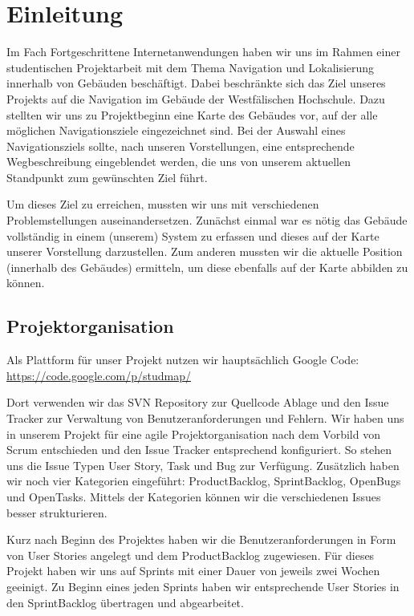 \chapter{Einleitung}
Im Fach Fortgeschrittene Internetanwendungen haben wir uns im Rahmen einer studentischen Projektarbeit mit dem Thema Navigation und Lokalisierung innerhalb von Gebäuden beschäftigt. Dabei beschränkte sich das Ziel unseres Projekts auf die Navigation im Gebäude der Westfälischen Hochschule. Dazu stellten wir uns zu Projektbeginn eine Karte des Gebäudes vor, auf der alle möglichen Navigationsziele eingezeichnet sind. Bei der Auswahl eines Navigationsziels sollte, nach unseren Vorstellungen, eine entsprechende Wegbeschreibung eingeblendet werden, die uns von unserem aktuellen Standpunkt zum gewünschten Ziel führt.

Um dieses Ziel zu erreichen, mussten wir uns mit verschiedenen Problemstellungen auseinandersetzen. Zunächst einmal war es nötig das Gebäude vollständig in einem (unserem) System zu erfassen und dieses auf der Karte unserer Vorstellung darzustellen. Zum anderen mussten wir die aktuelle Position (innerhalb des Gebäudes) ermitteln, um diese ebenfalls auf der Karte abbilden zu können.

\section{Projektorganisation}
Als Plattform für unser Projekt nutzen wir hauptsächlich Google Code:\\
\href{https://code.google.com/p/studmap/}{https://code.google.com/p/studmap/}

Dort verwenden wir das SVN Repository zur Quellcode Ablage und den Issue Tracker zur Verwaltung von Benutzeranforderungen und Fehlern. Wir haben uns in unserem Projekt für eine agile Projektorganisation nach dem Vorbild von Scrum entschieden und den Issue Tracker entsprechend konfiguriert. So stehen uns die Issue Typen User Story, Task und Bug zur Verfügung. Zusätzlich haben wir noch vier Kategorien eingeführt: ProductBacklog, SprintBacklog, OpenBugs und OpenTasks. Mittels der Kategorien können wir die verschiedenen Issues besser strukturieren.

Kurz nach Beginn des Projektes haben wir die Benutzeranforderungen in Form von User Stories angelegt und dem ProductBacklog zugewiesen. Für dieses Projekt haben wir uns auf Sprints mit einer Dauer von jeweils zwei Wochen geeinigt. Zu Beginn eines jeden Sprints haben wir entsprechende User Stories in den SprintBacklog übertragen und abgearbeitet.
